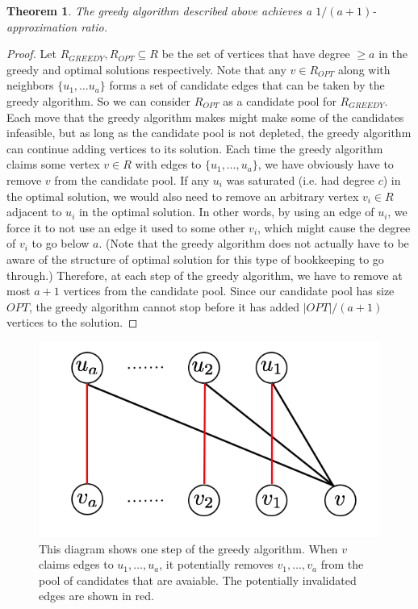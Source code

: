 \documentclass[]{article}
\newtheorem{thm}{Theorem}
\begin{document}
\begin{thm}
The greedy algorithm described above achieves a $1/(a+1)$-approximation ratio.
\end{thm}
\begin{proof}
Let $R_{GREEDY}, R_{OPT}\subseteq R$ be the set of vertices that have
degree $\geq a$ in the greedy and optimal solutions respectively. Note
that any $v \in R_{OPT}$ along with neighbors $\{u_1,\ldots u_a\}$
forms a set of candidate edges that can be taken by the greedy
algorithm. So we can consider $R_{OPT}$ as a candidate pool for
$R_{GREEDY}$. Each move that the greedy algorithm makes might make
some of the candidates infeasible, but as long as the candidate pool
is not depleted, the greedy algorithm can continue adding vertices to
its solution. Each time the greedy algorithm claims some vertex $v\in
R$ with edges to $\{u_1,\ldots, u_a\}$, we have obviously have to
remove $v$ from the candidate pool. If any $u_i$ was saturated
(i.e. had degree $c$) in the optimal solution, we would also need to
remove an arbitrary vertex $v_i\in R$ adjacent to $u_i$ in the optimal
solution. In other words, by using an edge of $u_i$, we force it to
not use an edge it used to some other $v_i$, which might cause the
degree of $v_i$ to go below $a$. (Note that the greedy algorithm does
not actually have to be aware of the structure of optimal solution for
this type of bookkeeping to go through.) Therefore, at each step of
the greedy algorithm, we have to remove at most $a+1$ vertices from
the candidate pool. Since our candidate pool has size $OPT$, the
greedy algorithm cannot stop before it has added $|OPT|/(a+1)$
vertices to the solution.
\end{proof}

\begin{figure}[h]
\centering
\includegraphics[width=.5\textwidth]{greedy.png}
\begin{minipage}[h]{.8\linewidth}
\caption{This diagram shows one step of the greedy algorithm. When $v$ claims edges to $u_1,\ldots, u_a$, it potentially removes $v_1,\ldots, v_a$ from the pool of candidates that are avaiable. The potentially invalidated edges are shown in red.}
\end{minipage}
\end{figure}
\end{document}
